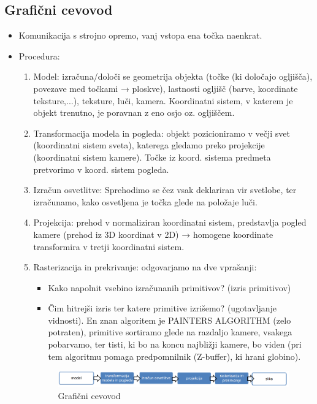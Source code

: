 \documentclass{article}
\begin{document}
\subsection{Grafični cevovod}
\begin{itemize}
    \item Komunikacija s strojno opremo, vanj vstopa ena točka naenkrat. 
    \item Procedura:
    \begin{enumerate}
        \item Model: izračuna/določi se geometrija objekta (točke (ki določajo ogljišča), povezave med točkami → ploskve), lastnosti ogljišč (barve, koordinate teksture,...), teksture, luči, kamera. Koordinatni sistem, v katerem je objekt trenutno, je poravnan z eno osjo oz. ogljiščem.
        \item Transformacija modela in pogleda: objekt pozicioniramo v večji svet (koordinatni sistem sveta), katerega gledamo preko projekcije (koordinatni sistem kamere). Točke iz koord. sistema predmeta pretvorimo v koord. sistem pogleda.
        \item Izračun osvetlitve: Sprehodimo se čez vsak deklariran vir svetlobe, ter izračunamo, kako osvetljena je točka glede na položaje luči.
        \item Projekcija: prehod v normaliziran koordinatni sistem, predstavlja pogled kamere (prehod iz 3D koordinat v 2D) → homogene koordinate transformira v tretji koordinatni sistem. 
        \item Rasterizacija in prekrivanje: odgovarjamo na dve vprašanji:
        \begin{itemize}
            \item Kako napolnit vsebino izračunanih primitivov? (izris primitivov)
            \item Čim hitrejši izris ter katere primitive izrišemo? (ugotavljanje vidnosti). En znan algoritem je PAINTERS ALGORITHM (zelo potraten), primitive sortiramo glede na razdaljo kamere, vsakega pobarvamo, ter tisti, ki bo na koncu najbližji kamere, bo viden (pri tem algoritmu pomaga predpomnilnik (Z-buffer), ki hrani globino).
        \end{itemize}
        \begin{figure}[H]
        \centering
        \includegraphics[width=150mm]{src/grafični_cevovod.png}
        \caption{Grafični cevovod}
        \end{figure} 
    \end{enumerate}
\end{itemize}
\end{document}
